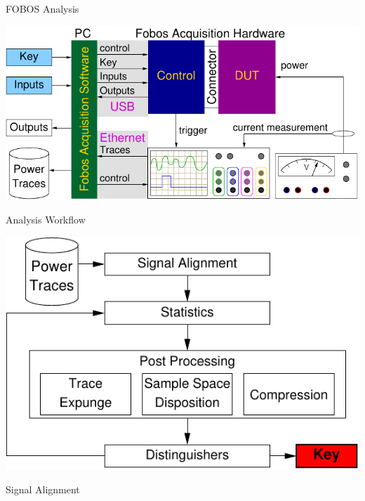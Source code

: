\documentclass[final]{beamer}
\begin{document}
\begin{frame}[fragile]{}
\begin{columns}[t]
\begin{column}{.31\linewidth}
       \begin{block}{FOBOS Analysis}
        \begin{center}
          \includegraphics[scale=1.5]{../figures/fobos-dac}
        \end{center} 
       \end{block}
       \begin{block}{Analysis Workflow}
        \begin{center}
          \includegraphics[scale=1.5]{../figures/data_anl}
        \end{center} 
       \end{block}
       \begin{block}{Signal Alignment}
        \begin{minipage}[t]{0.49\linewidth}

\end{minipage}
\end{block}
\end{column}
\end{columns}
\end{frame}
\end{document}
